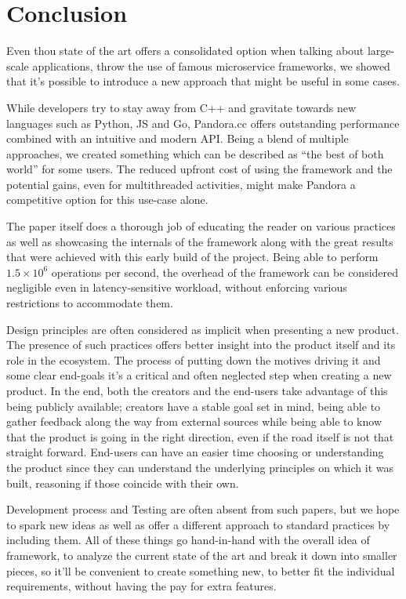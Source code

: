 \chapter{Conclusion}
Even thou state of the art offers a consolidated option when talking about large-scale applications, throw the use of famous microservice frameworks, we showed that it’s possible to introduce a new approach that might be useful in some cases.

While developers try to stay away from C++ and gravitate towards new languages such as Python, JS and Go, Pandora.cc offers outstanding performance combined with an intuitive and modern API. Being a blend of multiple approaches, we created something which can be described as “the best of both world” for some users. The reduced upfront cost of using the framework and the potential gains, even for multithreaded activities, might make Pandora a competitive option for this use-case alone.

The paper itself does a thorough job of educating the reader on various practices as well as showcasing the internals of the framework along with the great results that were achieved with this early build of the project. Being able to perform $1.5 \times 10^6$ operations per second, the overhead of the framework can be considered negligible even in latency-sensitive workload, without enforcing various restrictions to accommodate them.

Design principles are often considered as implicit when presenting a new product. The presence of such practices offers better insight into the product itself and its role in the ecosystem. The process of putting down the motives driving it and some clear end-goals it’s a critical and often neglected step when creating a new product. In the end, both the creators and the end-users take advantage of this being publicly available; creators have a stable goal set in mind, being able to gather feedback along the way from external sources while being able to know that the product is going in the right direction, even if the road itself is not that straight forward. End-users can have an easier time choosing or understanding the product since they can understand the underlying principles on which it was built, reasoning if those coincide with their own.
 
 Development process and Testing are often absent from such papers, but we hope to spark new ideas as well as offer a different approach to standard practices by including them. All of these things go hand-in-hand with the overall idea of framework, to analyze the current state of the art and break it down into smaller pieces, so it’ll be convenient to create something new, to better fit the individual requirements, without having the pay for extra features.

